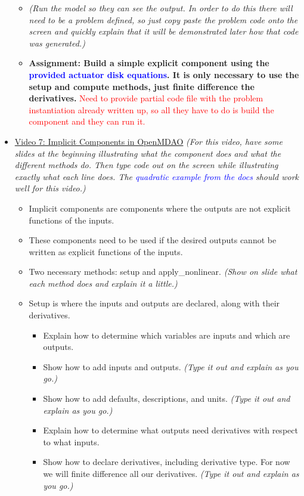 \documentclass[12pt, letterpaper]{article}
\begin{document}
\begin{itemize}
\begin{itemize}
			\item \textit{(Run the model so they can see the output. In order to do this there will need to be a problem defined, so just copy paste the problem code onto the screen and quickly explain that it will be demonstrated later how that code was generated.)}
			\item \textbf{Assignment: Build a simple explicit component using the \textcolor{blue}{provided actuator disk equations}. It is only necessary to use the setup and compute methods, just finite difference the derivatives.} \textcolor{red}{Need to provide partial code file with the problem instantiation already written up, so all they have to do is build the component and they can run it.}
		\end{itemize}

	\item \underline{Video 7: Implicit Components in OpenMDAO} \textit{(For this video, have some slides at the beginning illustrating what the component does and what the different methods do. Then type code out on the screen while illustrating exactly what each line does. The 					\textcolor{blue}{quadratic example from the docs} should work well for this video.)}
		\begin{itemize}
			\item Implicit components are components where the outputs are not explicit functions of the inputs.
			\item These components need to be used if the desired outputs cannot be written as explicit functions of the inputs.
			\item Two necessary methods: setup and apply\_nonlinear. \textit{(Show on slide what each method does and explain it a little.)}
			\item Setup is where the inputs and outputs are declared, along with their derivatives.
				\begin{itemize}
					\item Explain how to determine which variables are inputs and which are outputs.
					\item Show how to add inputs and outputs. \textit{(Type it out and explain as you go.)}
					\item Show how to add defaults, descriptions, and units. \textit{(Type it out and explain as you go.)}
					\item Explain how to determine what outputs need derivatives with respect to what inputs.
					\item Show how to declare derivatives, including derivative type. For now we will finite difference all our derivatives. \textit{(Type it out and explain as you go.)}

\end{itemize}
\end{itemize}
\end{itemize}
\end{document}
